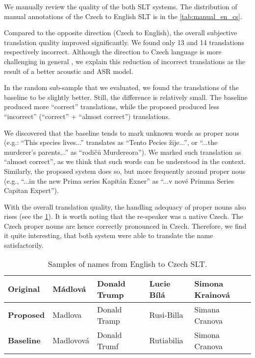 We manually review the quality of the both SLT systems. The distribution of manual annotations of the Czech to English SLT is in the \cref{tab:manual_en_cs}. 

Compared to the opposite direction (Czech to English), the overall subjective translation quality improved significantly. We found only 13 and 14 translations respectively incorrect. Although the direction to Czech language is more challenging in general , we explain this reduction of incorrect translations as the result of a better acoustic and ASR model.

In the random sub-sample that we evaluated, we found the translations of the baseline to be slightly better. Still, the difference is relatively small. The baseline produced more ``correct'' translations, while the proposed produced less ``incorrect'' (``correct'' + ``almost correct'') translations. 

We discovered that the baseline tends to mark unknown words as proper nous (e.g.: ``This species lives...'' translates as ``Tento Pecies žije...'', or ``...the murderer's parents...'' as ``rodičů Murdereora''). We marked such translation as ``almost correct'', as we think that such words can be understood in the context. Similarly, the proposed system does so, but more frequently around proper nous (e.g., ``...in the new Prima series Kapitán Exner'' as ``...v nové Primma Series Capitan Expert'').

With the overall translation quality, the handling adequacy of proper nouns also rises (see the \cref{tab:en_cs_names}). It is worth noting that the re-speaker was a native Czech. The Czech proper nouns are hence correctly pronounced in Czech. Therefore, we find it quite interesting, that both system were able to translate the name satisfactorily.


\begin{table}[]
	\centering
	\small
	\begin{tabular}{l|llll}
		\textbf{Original} & Mádlová & Donald Trump  & Lucie Bílá     & Simona Krainová       \\ \hline
		\textbf{Proposed} & Madlova     & Donald Tramp & Rusi-Billa      & Simana Cranova  \\
		\textbf{Baseline} & Madlovová    &  Donald Trumf   & Rutiabilia & Simona Cranova
	\end{tabular}
	\caption{Samples of names from English to Czech SLT.}
	\label{tab:en_cs_names}
\end{table}

